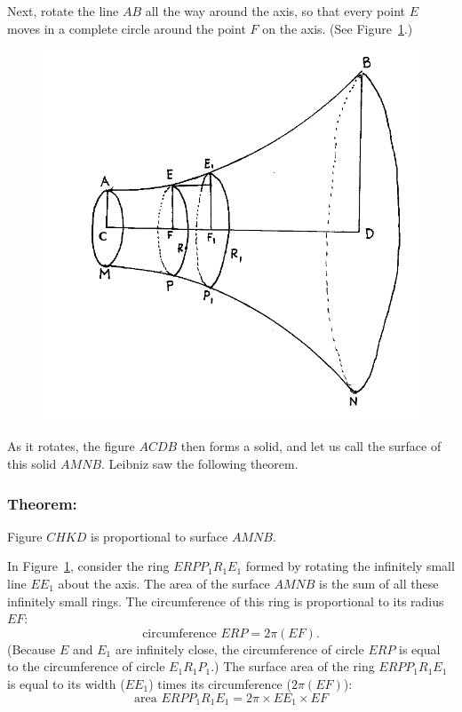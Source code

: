 \documentclass[polutonikogreek,english,twoside,openright]{article}
\begin{document}
Next, rotate the line $AB$ all the way around the axis, so that every
point $E$ moves in a complete circle around the point $F$ on the
axis. (See Figure~\ref{rotate}.)
\begin{figure}[ht]
\begin{center}
\includegraphics[width=\textwidth]{fig/Figure45a}
\caption{}
\label{rotate}
\vspace{-10pt}
\end{center}
\end{figure} As it rotates, the figure $ACDB$ then forms a solid, and
let us call the surface of this solid $AMNB$.  Leibniz saw the
following theorem.

\subsubsection*{Theorem:}

Figure $CHKD$ is proportional to surface $AMNB$.

\hspace{1ex}


In Figure~\ref{rotate}, consider the ring $ERPP_1R_1E_1$ formed by
rotating the infinitely small line $EE_1$ about the axis.  The area of
the surface $AMNB$ is the sum of all these infinitely small rings.
The circumference of this ring is proportional to its radius $EF$:
$$\mbox{circumference }ERP = 2\pi(EF).$$
(Because $E$ and $E_1$ are infinitely close, the circumference of
circle $ERP$ is equal to the circumference of circle $E_1R_1P_1$.)
The surface area of the ring $ERPP_1R_1E_1$ is equal to its width
($EE_1$) times its circumference ($2\pi (EF)$):
\setcounter{equation}{0}
\begin{equation}
\mbox{area }ERPP_1R_1E_1 = 2\pi \times EE_1 \times EF
\end{equation}
\end{document}
